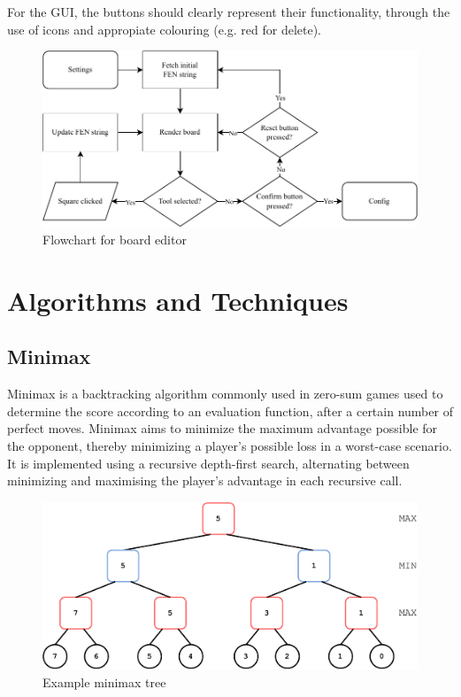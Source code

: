 \documentclass[../main/main.tex]{subfiles}
\begin{document}
For the GUI, the buttons should clearly represent their functionality, through the use of icons and appropiate colouring (e.g. red for delete).

\begin{figure}[H]
    \centering
    \includegraphics[width=\columnwidth]{../design/assets/editor_flowchart.pdf}
    \caption{Flowchart for board editor}
    \label{fig:editor-flowchart}
\end{figure}

\section{Algorithms and Techniques}
\subsection{Minimax}
Minimax is a backtracking algorithm commonly used in zero-sum games used to determine the score according to an evaluation function, after a certain number of perfect moves. Minimax aims to minimize the maximum advantage possible for the opponent, thereby minimizing a player’s possible loss in a worst-case scenario. It is implemented using a recursive depth-first search, alternating between minimizing and maximising the player’s advantage in each recursive call.

\begin{figure}[H]
    \centering
    \includegraphics[width=\columnwidth]{../design/assets/minimax.pdf}
    \caption{Example minimax tree}
    \label{fig:minimax}
\end{figure}
\end{document}
